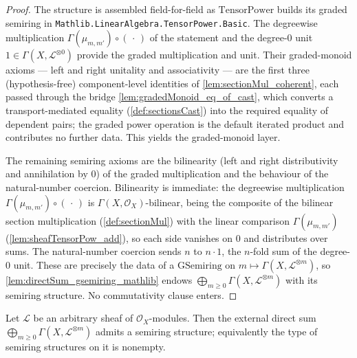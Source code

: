 \begin{proof}
  \leanok
  The structure is assembled field-for-field as \(\mathrm{TensorPower}\) builds its
  graded semiring in \texttt{Mathlib.LinearAlgebra.TensorPower.Basic}. The
  degreewise multiplication \(\Gamma(\mu_{m,m'}) \circ (\,\cdot\,)\) of the
  statement and the degree-\(0\) unit \(1 \in \Gamma(X, \mathcal{L}^{\otimes 0})\)
  provide the graded multiplication and unit. Their graded-monoid axioms --- left
  and right unitality and associativity --- are the first three (hypothesis-free)
  component-level identities of \cref{lem:sectionMul_coherent}, each passed through
  the bridge \cref{lem:gradedMonoid_eq_of_cast}, which converts a
  transport-mediated equality (\cref{def:sectionsCast}) into the required equality
  of dependent pairs; the graded power operation is the default iterated product
  and contributes no further data. This yields the graded-monoid layer.

  The remaining semiring axioms are the bilinearity (left and right distributivity
  and annihilation by \(0\)) of the graded multiplication and the behaviour of the
  natural-number coercion. Bilinearity is immediate: the degreewise multiplication
  \(\Gamma(\mu_{m,m'}) \circ (\,\cdot\,)\) is \(\Gamma(X,\mathcal{O}_X)\)-bilinear,
  being the composite of the bilinear section multiplication (\cref{def:sectionMul})
  with the linear comparison \(\Gamma(\mu_{m,m'})\)
  (\cref{lem:sheafTensorPow_add}), so each side vanishes on \(0\) and distributes
  over sums. The natural-number coercion sends \(n\) to \(n \cdot 1\), the
  \(n\)-fold sum of the degree-\(0\) unit. These are precisely the data of a
  \(\mathrm{GSemiring}\) on \(m \mapsto \Gamma(X, \mathcal{L}^{\otimes m})\), so
  \cref{lem:directSum_gsemiring_mathlib} endows
  \(\bigoplus_{m \ge 0} \Gamma(X, \mathcal{L}^{\otimes m})\) with its semiring
  structure. No commutativity clause enters.
\end{proof}

\begin{lemma}\leanok
  \label{lem:sectionGradedRing_semiring_nonempty}
  Let \(\mathcal{L}\) be an arbitrary sheaf of \(\mathcal{O}_X\)-modules. Then the
  external direct sum \(\bigoplus_{m \ge 0} \Gamma(X,\mathcal{L}^{\otimes m})\)
  admits a semiring structure; equivalently the type of semiring structures on it
  is nonempty.
\end{lemma}

